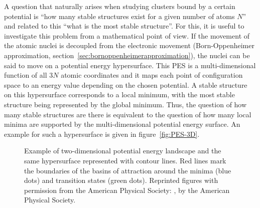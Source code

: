 A question that naturally arises when studying clusters bound by a certain
potential is ``how many stable structures exist for a given number of atoms
$N$'' and related to this ``what is the most stable structure''. For this, it is
useful to investigate this problem from a mathematical point of view. If the
movement of the atomic nuclei is decoupled from the electronic movement
(Born-Oppenheimer approximation,
section~\ref{sec:bornoppenheimerapproximation}), the nuclei can be said to move
on a potential energy hypersurface. This \ac{PES} is a multi-dimensional
function of all $3N$ atomic coordinates and it maps each point of configuration
space to an energy value depending on the chosen potential. A stable structure
on this hypersurface corresponds to a local minimum, with the most stable
structure being represented by the global minimum. Thus, the question of how
many stable structures are there is equivalent to the question of how many local
minima are supported by the multi-dimensional potential energy surface. An example for such a hypersurface is given in figure~\ref{fig:PES-3D}.
%
\begin{figure}[htb]
    \centering
    \hspace{0.05\textwidth}
    \caption{\protect{} Example of two-dimensional potential energy landscape and \protect{} the same hypersurface represented with contour lines. Red lines mark the boundaries of the basins of attraction around the minima (blue dots) and transition states (green dots). Reprinted figures with permission from the American Physical Society: \autocite{Massen_Powerlawdistributionsareas_2007},  by the American Physical Society.}
    \label{fig:PES}
\end{figure}
